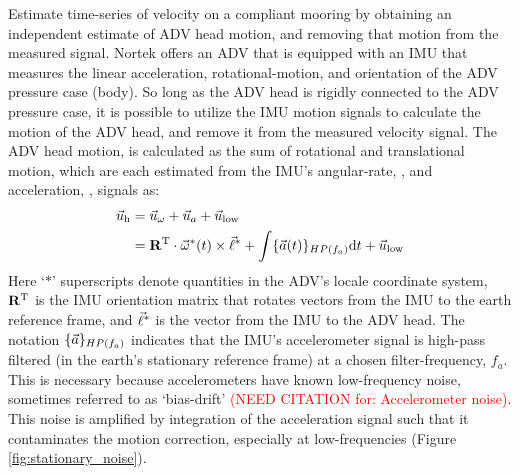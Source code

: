 \documentclass[twocol]{ametsoc}
\newcommand{\citeneeded}[1]{\textcolor{red}{(NEED CITATION for: #1)}}
\begin{document}
Estimate time-series of velocity on a compliant mooring by obtaining an independent estimate of ADV head motion, and removing that motion from the measured signal. Nortek offers an ADV that is equipped with an IMU that measures the linear acceleration, rotational-motion, and orientation of the ADV pressure case (body). So long as the ADV head is rigidly connected to the ADV pressure case, it is possible to utilize the IMU motion signals to calculate the motion of the ADV head, and remove it from the measured velocity signal.  The ADV head motion, is calculated as the sum of rotational and translational motion, which are each estimated from the IMU's angular-rate, \AngRt, and acceleration, \Accel, signals as:
\begin{align}
  \vec{u}_\mathrm{h} & = \vec{u}_\omega + \vec{u}_a + \vec{u}_\mathrm{low} \\
      & = \mathbf{R}^\mathrm{T} \cdot \vec{\omega}^*(t)\times\vec{\ell}^* + \int \{{\vec{a}}(t)\}_{HP(f_{a})} \mathrm{d}t + \vec{u}_\mathrm{low}
\end{align}
Here `$*$' superscripts denote quantities in the ADV's locale coordinate system, $\mathbf{R}^\mathrm{T}$ is the IMU orientation matrix that rotates vectors from the IMU to the earth reference frame, and $\vec{\ell}^*$ is the vector from the IMU to the ADV head. The notation $\{{\vec{a}}\}_{HP(f_a)}$ indicates that the IMU's accelerometer signal is high-pass filtered (in the earth's stationary reference frame) at a chosen filter-frequency, $f_a$. This is necessary because accelerometers have known low-frequency noise, sometimes referred to as `bias-drift' \citeneeded{Accelerometer noise}. This noise is amplified by integration of the acceleration signal such that it contaminates the motion correction, especially at low-frequencies (Figure \ref{fig:stationary_noise}).


\end{document}

